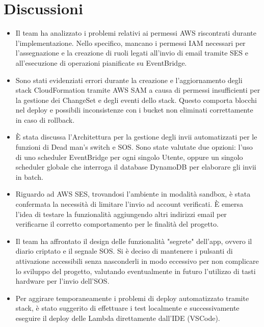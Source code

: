 \documentclass[a4paper,12pt]{article}
\begin{document}
\section{Discussioni}
\begin{itemize}
    \item Il team ha analizzato i problemi relativi ai permessi AWS riscontrati durante l'implementazione. Nello specifico, mancano i permessi IAM necessari per l'assegnazione e la creazione di ruoli legati all'invio di email tramite SES e all'esecuzione di operazioni pianificate su EventBridge.
    \item Sono stati evidenziati errori durante la creazione e l'aggiornamento degli stack CloudFormation tramite AWS SAM a causa di permessi insufficienti per la gestione dei ChangeSet e degli eventi dello stack. Questo comporta blocchi nel deploy e possibili inconsistenze con i bucket non eliminati correttamente in caso di rollback.
    \item È stata discussa l'Architettura per la gestione degli invii automatizzati per le funzioni di Dead man's switch e SOS. Sono state valutate due opzioni: l'uso di uno scheduler EventBridge per ogni singolo Utente, oppure un singolo scheduler globale che interroga il database DynamoDB per elaborare gli invii in batch.
    \item Riguardo ad AWS SES, trovandosi l'ambiente in modalità sandbox, è stata confermata la necessità di limitare l'invio ad account verificati. È emersa l'idea di testare la funzionalità aggiungendo altri indirizzi email per verificarne il corretto comportamento per le finalità del progetto.
    \item Il team ha affrontato il design delle funzionalità "segrete" dell'app, ovvero il diario criptato e il segnale SOS. Si è deciso di mantenere i pulsanti di attivazione accessibili senza nasconderli in modo eccessivo per non complicare lo sviluppo del progetto, valutando eventualmente in futuro l'utilizzo di tasti hardware per l'invio dell'SOS.
    \item Per aggirare temporaneamente i problemi di deploy automatizzato tramite stack, è stato suggerito di effettuare i test localmente e successivamente eseguire il deploy delle Lambda direttamente dall'IDE (VSCode).
\end{itemize}

\end{document}

